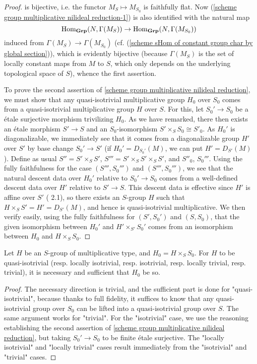 \begin{proof}
is bijective, i.e. the functor $M_S\mapsto M_{S_0}$ is faithfully flat. Now (\ref{scheme group multiplicative nilideal reduction-1}) is also identified with the natural map
\[\mathrm{Hom}_{\mathbf{Grp}}(N,\Gamma(M_S))\to\mathrm{Hom}_{\mathbf{Grp}}(N,\Gamma(M_{S_0}))\]
induced from $\Gamma(M_S)\to\Gamma(M_{S_0})$ (cf. (\cref{scheme sHom of constant group char by global section})), which is evidently bijective (because $\Gamma(M_S)$ is the set of locally constant maps from $M$ to $S$, which only depends on the underlying topological space of $S$), whence the first assertion.\par
To prove the second assertion of \cref{scheme group multiplicative nilideal reduction}, we must show that any quasi-isotrivial multiplicative group $H_0$ over $S_0$ comes from a quasi-isotrivial multiplicative group $H$ over $S$. For this, let $S_0'\to S_0$ be a \'etale surjective morphism trivilizing $H_0$. As we have remarked, there then exists an \'etale morphism $S'\to S$ and an $S_0$-isomorphism $S'\times_SS_0\cong S'_0$. As $H_0'$ is diagonalizable, we immediately see that it comes from a diagonalizable group $H'$ over $S'$ by base change $S_0'\to S'$ (if $H_0'=D_{S_0'}(M)$, we can put $H'=D_{S'}(M)$). Define as usual $S''=S'\times_SS'$, $S'''=S'\times_SS'\times_SS'$, and $S''_0$, $S_0'''$. Using the fully faithfulness for the case $(S''',S_0''')$ and $(S''',S_0''')$, we see that the natural descent data over $H_0'$ relative to $S_0'\to S_0$ comes from a well-defined descent data over $H'$ relative to $S'\to S$. This descent data is effective since $H'$ is affine over $S'$ (\cite{SGA1}  2.1), so there exists an $S$-group $H$ such that $H\times_SS'=H'=D_{S'}(M)$, and hence is quasi-isotrivial multiplicative. We then verify easily, using the fully faithfulness for $(S',S_0')$ and $(S,S_0)$, that the given isomorphism between $H_0'$ and $H'\times_{S'}S_0'$ comes from an isomorphism between $H_0$ and $H\times_SS_0$.
\end{proof}

\begin{corollary}\label{scheme group multiplicative nilideal reduction triviality}
Let $H$ be an $S$-group of multiplicative type, and $H_0=H\times_SS_0$. For $H$ to be quasi-isotrivial (resp. locally isotrivial, resp. isotrivial, resp. locally trivial, resp. trivial), it is necessary and sufficient that $H_0$ be so.
\end{corollary}
\begin{proof}
The necessary direction is trivial, and the sufficient part is done for "quasi-isotrivial", because thanks to full fidelity, it suffices to know that any quasi-isotrivial group over $S_0$ can be lifted into a quasi-isotrivial group over $S$. The same argument works for "trivial". For the "isotrivial" case, we use the reasoning establishing the second assertion of \cref{scheme group multiplicative nilideal reduction}, but taking $S_0'\to S_0$ to be finite \'etale surjective. The "locally isotrivial" and "locally trivial" cases result immediately from the "isotrivial" and "trivial" cases.
\end{proof}

